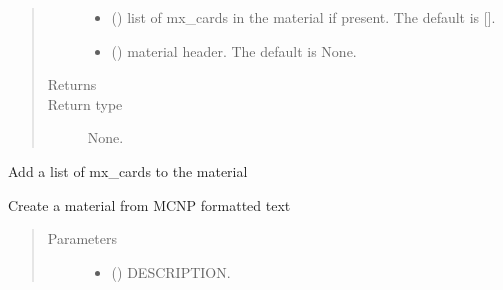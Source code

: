 \documentclass[letterpaper,10pt,english]{sphinxmanual}
\begin{document}
\begin{fulllineitems}
\begin{quote}
\begin{description}
\begin{itemize}
\item {} 
 (\sphinxstyleliteralemphasis{\sphinxupquote{, }}) \textendash{} list of mx\_cards in the material if present. The default is {[}{]}.

\item {} 
 (\sphinxstyleliteralemphasis{\sphinxupquote{, }}) \textendash{} material header. The default is None.

\end{itemize}

\item[{Returns}] \leavevmode


\item[{Return type}] \leavevmode
None.

\end{description}\end{quote}

\begin{fulllineitems}
\label{\detokenize{api/inputgeneration:matreader.Material.add_mx}}
Add a list of mx\_cards to the material

\end{fulllineitems}


\begin{fulllineitems}
\label{\detokenize{api/inputgeneration:matreader.Material.from_text}}
Create a material from MCNP formatted text
\begin{quote}\begin{description}
\item[{Parameters}] \leavevmode\begin{itemize}
\item {} 
 () \textendash{} DESCRIPTION.


\end{itemize}
\end{description}
\end{quote}
\end{fulllineitems}
\end{fulllineitems}
\end{document}
